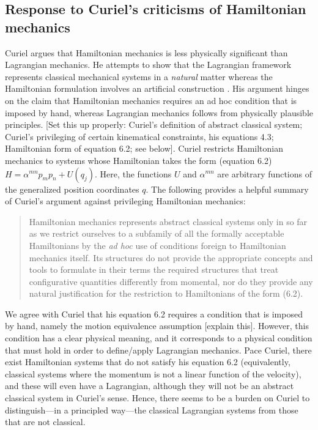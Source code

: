 \documentclass[letterpaper]{article}
\begin{document}
\subsection{Response to Curiel's criticisms of Hamiltonian mechanics}
\label{Curiel}

Curiel \parencites*[]{Curiel} argues that Hamiltonian mechanics is less physically significant than Lagrangian mechanics. He attempts to show that the Lagrangian framework represents classical mechanical systems in a \textit{natural} matter whereas the Hamiltonian formulation involves an artificial construction \parencites*[270]{Curiel}. His argument hinges on the claim that Hamiltonian mechanics requires an ad hoc condition that is imposed by hand, whereas Lagrangian mechanics follows from physically plausible principles. [Set this up properly: Curiel's definition of abstract classical system; Curiel's privileging of certain kinematical constraints, his equations 4.3; Hamiltonian form of equation 6.2; see below]. Curiel restricts Hamiltonian mechanics to systems whose Hamiltonian takes the form (equation 6.2) $H =\alpha^{m n} p_m p_n + U (q_j) $. Here, the functions $U$ and $\alpha^{m n}$ are arbitrary functions of the generalized position coordinates $q $. The following provides a helpful summary of Curiel's argument against privileging Hamiltonian mechanics: 

\begin{quotation}
Hamiltonian mechanics represents abstract classical systems only in so far as we restrict ourselves to a subfamily of all the formally acceptable Hamiltonians by the \textit{ad hoc} use of conditions foreign to Hamiltonian mechanics itself. Its structures do not provide the appropriate concepts and tools to formulate in their terms the required structures that treat configurative quantities differently from momental, nor do they provide any natural justification for the restriction to Hamiltonians of the form (6.2). \parencites[306]{Curiel}
\end{quotation}

We agree with Curiel that his equation 6.2 requires a condition that is imposed by hand, namely the motion equivalence assumption [explain this]. However, this condition has a clear physical meaning, and it corresponds to a physical condition that must hold in order to define/apply Lagrangian mechanics. Pace Curiel, there exist Hamiltonian systems that do not satisfy his equation 6.2 (equivalently, classical systems where the momentum is not a linear function of the velocity), and these will even have a Lagrangian, although they will not be an abstract classical system in Curiel's sense. Hence, there seems to be a burden on Curiel to distinguish---in a principled way---the classical Lagrangian systems from those that are not classical.
\end{document}
